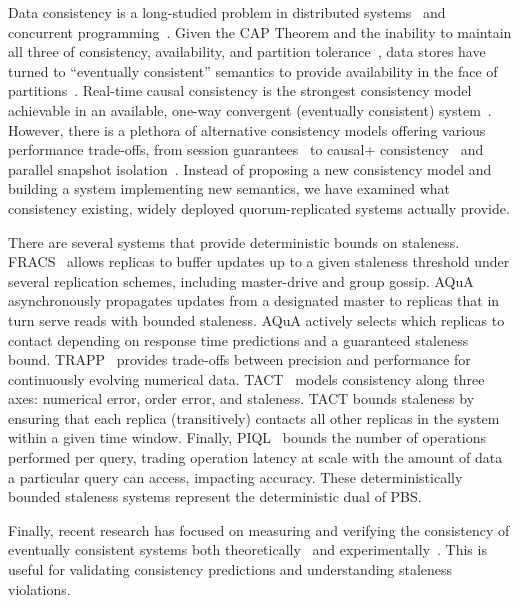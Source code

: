 \documentclass{vldb}
\begin{document}
Data consistency is a long-studied problem in distributed
systems~\cite{consistency-partitioned, danger-rep} and concurrent
programming~\cite{linearizability}.  Given the CAP Theorem and the
inability to maintain all three of consistency, availability, and
partition tolerance~\cite{cap-proof}, data stores have turned to
``eventually consistent'' semantics to provide availability in the
face of partitions~\cite{consistency-partitioning, vogels-defs}.
Real-time causal consistency is the strongest consistency model
achievable in an available, one-way convergent (eventually consistent)
system~\cite{rtc-proof}. However, there is a plethora of alternative
consistency models offering various performance trade-offs, from
session guarantees~\cite{sessionguarantees} to causal+
consistency~\cite{cops} and parallel snapshot isolation~\cite{walter}.
Instead of proposing a new consistency model and building a system
implementing new semantics, we have examined what consistency
existing, widely deployed quorum-replicated systems actually provide.

There are several systems that provide deterministic bounds on
staleness.  FRACS~\cite{frac} allows replicas to buffer updates up to
a given staleness threshold under several replication schemes,
including master-drive and group gossip.  AQuA~\cite{aqua}
asynchronously propagates updates from a designated master to replicas
that in turn serve reads with bounded staleness.  AQuA actively
selects which replicas to contact depending on response time
predictions and a guaranteed staleness bound.  TRAPP~\cite{trapp}
provides trade-offs between precision and performance for continuously
evolving numerical data.  TACT~\cite{vahdat-article, vahdat-bounded}
models consistency along three axes: numerical error, order error, and
staleness.  TACT bounds staleness by ensuring that each replica
(transitively) contacts all other replicas in the system within a
given time window.  Finally, PIQL~\cite{piql} bounds the number of
operations performed per query, trading operation latency at scale
with the amount of data a particular query can access, impacting
accuracy. These deterministically bounded staleness systems represent
the deterministic dual of PBS.

Finally, recent research has focused on measuring and verifying the
consistency of eventually consistent systems both theoretically~\cite{podc-hpl} and
experimentally~\cite{measure-consistency, consistency-cidr}. This is useful for validating
consistency predictions and understanding staleness violations.
\end{document}
